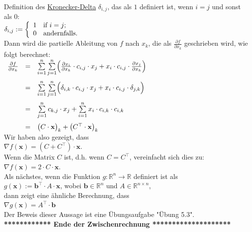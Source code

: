 \documentclass[12pt]{article}
\begin{document}
Definition des \href{https://en.wikipedia.org/wiki/Kronecker_delta}{Kronecker-Delta} $\delta_{i,j}$, das
als $1$ definiert ist, wenn $i = j$ und sonst als $0$:
\\[0.2cm]
\hspace*{1.3cm}
$ \delta_{i,j} := 
\left\{{
\begin{array}[c]{ll}
  1 & \mbox{if $i = j$;} \\
  0 & \mbox{andernfalls.}
\end{array}}
\right. 
$
\\[0.2cm]
%
Dann wird die partielle Ableitung von $f$ nach $x_k$, die als $ \frac{\partial f}{\partial x_k}$ geschrieben wird, wie folgt berechnet:
\\[0.2cm]
\hspace*{1.3cm}
$
\begin{array}[t]{lcl}
 \frac{\partial f}{\partial x_k} & = &
 \sum\limits_{i=1}^n \sum\limits_{j=1}^n \Bigl(
    \frac{\partial x_i}{\partial x_k} \cdot c_{i,j} \cdot x_j + x_i \cdot c_{i,j} \cdot \frac{\partial x_j}{\partial x_k}
    \Bigr) \\[0.5cm]
& = &
 \sum\limits_{i=1}^n \sum\limits_{j=1}^n \Bigl(
    \delta_{i,k} \cdot c_{i,j} \cdot x_j + x_i \cdot c_{i,j} \cdot \delta_{j,k} \Bigr) \\[0.5cm]
& = &
 \sum\limits_{j=1}^n c_{k,j} \cdot x_j + \sum\limits_{i=1}^n x_i \cdot c_{i,k} \cdot c_{i,k} \\[0.5cm]
& = & \bigl(C \cdot \mathbf{x}\bigr)_k + \bigl(C^\top \cdot \mathbf{x}\bigr)_k
\end{array}
$
\\[0.3cm]
Wir haben also gezeigt, dass 
\\[0.3cm]
\hspace*{1.3cm}
$ \nabla f(\mathbf{x}) = (C + C^\top) \cdot \mathbf{x}$.
\\[0.2cm]
Wenn die Matrix $C$ {\color{blue}{symmetrisch}} ist, d.h. wenn $C = C^\top$, vereinfacht sich dies zu:
\\[0.2cm]
\hspace*{1.3cm}
$ \nabla f(\mathbf{x}) = 2 \cdot C \cdot \mathbf{x}$.
\\[0.5cm]
Als nächstes, wenn die Funktion $g: \mathbb{R}^n \rightarrow \mathbb{R}$ definiert ist als 
\\[0.2cm]
\hspace*{1.3cm}
$g(\mathbf{x}) := \mathbf{b}^\top \cdot A \cdot \mathbf{x}$, \quad wobei $\mathbf{b} \in \mathbb{R}^n$ und $A \in \mathbb{R}^{n \times n}$,
\\[0.2cm]
dann zeigt eine ähnliche Berechnung, dass
\\[0.2cm]
\hspace*{1.3cm}
$ \nabla g(\mathbf{x}) = A^\top \cdot \mathbf{b}$ \\[0.2cm]
Der Beweis dieser Aussage ist eine Übungsaufgabe "Übung 5.3".\\[0.2cm]
\textbf{************ Ende der Zwischenrechnung ********************}\\
\end{document}
